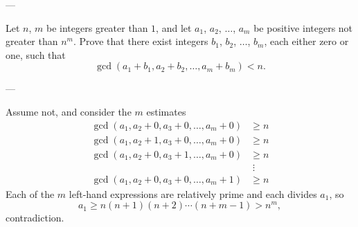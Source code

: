 
---

Let $n$, $m$ be integers greater than $1$, and let $a_1$, $a_2$, $\ldots$, $a_m$ be positive integers not greater than $n^m$. Prove that there exist integers $b_1$, $b_2$, $\ldots$, $b_m$, each either zero or one, such that \[\gcd(a_1+b_1,a_2+b_2,\ldots,a_m+b_m)<n.\]

---

Assume not, and consider the $m$ estimates
\begin{align*}
    \gcd(a_1,a_2+0,a_3+0,\ldots,a_m+0)&\ge n\\
    \gcd(a_1,a_2+1,a_3+0,\ldots,a_m+0)&\ge n\\
    \gcd(a_1,a_2+0,a_3+1,\ldots,a_m+0)&\ge n\\
    &\;\vdots\\
    \gcd(a_1,a_2+0,a_3+0,\ldots,a_m+1)&\ge n
\end{align*}
Each of the $m$ left-hand expressions are relatively prime and each divides $a_1$, so \[a_1\ge n(n+1)(n+2)\cdots(n+m-1)>n^m,\]
contradiction.

